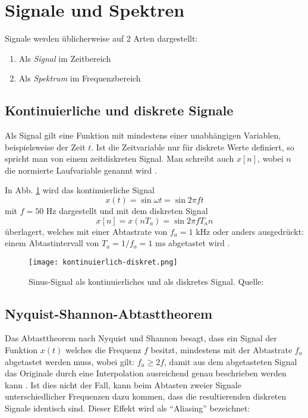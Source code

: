 \newpage
\section{Signale und Spektren}
Signale werden üblicherweise auf 2 Arten dargestellt:
\begin{enumerate}
	\item Als \textit{Signal} im Zeitbereich
	\item Als \textit{Spektrum} im Frequenzbereich
\end{enumerate}




\subsection{Kontinuierliche und diskrete Signale}
Als Signal gilt eine Funktion mit mindestens einer unabhängigen Variablen, beispielsweise der Zeit \(t\). Ist die Zeitvariable nur für diskrete Werte definiert, so spricht man von einem zeitdiskreten Signal. Man schreibt auch \(x[n]\), wobei \(n\) die normierte Laufvariable genannt wird \cite[vgl. Werner, S. 24]{Werner:2017}.

In Abb. \ref{kontinuierlich_diskret} wird das kontinuierliche Signal
\[x(t) = \sin \omega t = \sin 2\pi f t\]
mit \(f = 50 \text{ Hz} \) dargestellt und mit dem diskreten Signal
\[x[n] = x(nT_a) = \sin 2\pi f T_a n\]
überlagert, welches mit einer Abtastrate von \(f_a = 1 \text{ kHz}\) oder anders ausgedrückt: einem Abtastintervall von \(T_a = 1 / f_a = 1 \text{ ms}\) abgetastet wird \cite[vgl. Heuberger, e. a., S. 11f]{Heuberger:2017}.

\begin{figure}[ht]
	\centering
	\texttt{[image: kontinuierlich-diskret.png]}
	\caption[Sinus-Signal als kontinuierliches und als diskretes Signal]{Sinus-Signal als kontinuierliches und als diskretes Signal. \newline Quelle: \cite[Heuberger, e. a., S. 12]{Heuberger:2017}} 
	\label{kontinuierlich_diskret}
\end{figure}




\subsection{Nyquist-Shannon-Abtasttheorem}
Das Abtasttheorem nach Nyquist und Shannon besagt, dass ein Signal der Funktion \(x(t)\) welches die Frequenz \(f\) besitzt, mindestens mit der Abtastrate \(f_a\) abgetastet werden muss, wobei gilt: \(f_a \ge 2f\), damit aus dem abgetasteten Signal das Originale durch eine Interpolation ausreichend genau beschrieben werden kann \cite[vgl. Werner, S. 30]{Werner:2006}. 
Ist dies nicht der Fall, kann beim Abtasten zweier Signale unterschiedlicher Frequenzen dazu kommen, dass die resultierenden diskreten Signale identisch sind. Dieser Effekt wird als \enquote{Aliasing} bezeichnet:

